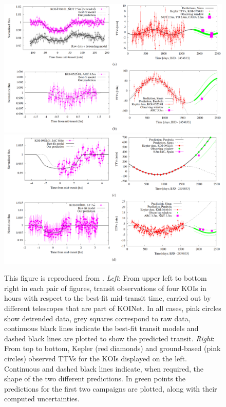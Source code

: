 
\begin{figure}
    \centering
    \includegraphics[scale=0.23]{koinet/caro1.png}
    \includegraphics[scale=0.23]{koinet/caro2.png}
    \caption{This figure is reproduced from \citet{vonEssen2018}. {\it Left}: From upper left to bottom right in each pair of figures, transit observations of four KOIs in hours with respect to the best-fit mid-transit time, carried out by different telescopes that are part of KOINet. In all cases, pink circles show detrended data, grey squares correspond to raw data, continuous black lines indicate the best-fit transit models and dashed black lines are plotted to show the predicted transit. {\it Right}: From top to bottom, Kepler (red diamonds) and ground-based (pink circles) observed TTVs for the KOIs displayed on the left. Continuous and dashed black lines indicate, when required, the shape of the two different predictions. In green points the predictions for the first two campaigns are plotted, along with their computed uncertainties.}
    \label{fig:koinet}
\end{figure}

